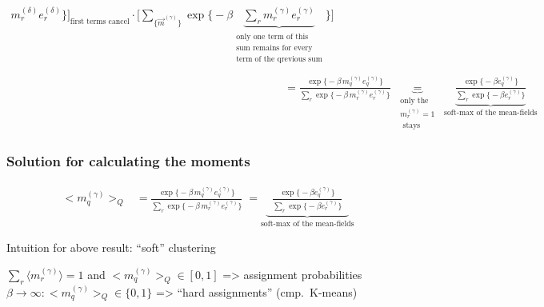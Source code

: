 \begin{frame}
\begin{equation}
\begin{array}{ll}
{{			m_{r}^{(\delta)}e_{r}^{(\delta)} \Big\} \Bigg]
			}_{ \text{first terms cancel} } 
			\cdot \Bigg[ \sum\limits_{ \big\{ \vec{m}^{(\gamma)} 
			\big\} } \exp \Big\{ -\beta
			\underbrace{ \sum\limits_{r} m_{r}^{(\gamma)}
				e_{r}^{(\gamma)} }_{
				\substack{	\text{only one term of this} \\
						\text{sum remains for every} \\
						\text{term of the qrevious }
						\text{sum}} }
				\Big\} \Bigg] } \\\\
	 & = \frac{ \exp \big\{ -\beta\, m_q^{(\gamma)} e_q^{(\gamma)} \big\} }{
	 	\sum\limits_{r} \exp \big\{ -\beta \,
	 	m_{r}^{(\gamma)} e_{r}^{(\gamma)} \big\} }
	\; \underbrace{=}_{\substack{\text{only the } \\ m_r^{(\gamma)} = 1 \\\text{ stays}}} \; \underbrace{\frac{ \exp \big\{ -\beta e_q^{(\gamma)} \big\} }{
		\sum\limits_{r} \exp \big\{ -\beta 
		e_{r}^{(\gamma)} \big\} }}_{\text{soft-max of the mean-fields}}
	\end{array}
\end{equation}
\end{frame}

\begin{frame}
\frametitle{Solution for calculating the moments}
$$
		\begin{array}{lll}
	\big< m_q^{(\gamma)} \big>_Q
	& = \frac{ \exp \big\{ -\beta\, m_q^{(\gamma)} e_q^{(\gamma)} \big\} }{
	 	\sum\limits_{r} \exp \big\{ -\beta \,
	 	m_{r}^{(\gamma)} e_{r}^{(\gamma)} \big\} }
	\; = \underbrace{\;\; \frac{ \exp \big\{ -\beta e_q^{(\gamma)} \big\} }{
		\sum\limits_{r} \exp \big\{ -\beta 
		e_{r}^{(\gamma)} \big\} }\;\;}_{\text{soft-max of the mean-fields}}
	\end{array}
$$
\begin{block}{Intuition for above result: ``soft'' clustering}
\begin{itemize}
\itr $\sum_r \langle m_r^{(\gamma)} \rangle = 1$  and $\big< m_q^{(\gamma)} \big>_Q \in [0, 1]$ => assignment probabilities
\itr $\beta \rightarrow \infty: \big< m_q^{(\gamma)} \big>_Q \in \{0, 1\} $ => ``hard assignments'' (cmp.\ K-means)
\end{itemize} 
\end{block}
\end{frame}

